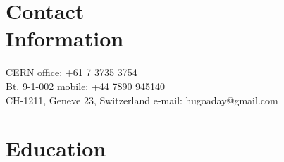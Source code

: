 \documentclass[margin,line]{resume}
\begin{document}
\begin{resume}

    \section{\mysidestyle Contact\\Information}

    CERN                            \hfill office: +61 7 3735 3754          \vspace{0mm}\\\vspace{0mm}%
    Bt. 9-1-002                          \hfill mobile: +44 7890 945140          \vspace{0mm}\\\vspace{0mm}%
    CH-1211, Geneve 23, Switzerland      \hfill e-mail: hugoaday@gmail.com  \vspace{0mm}\\\vspace{-4.5mm}%





    \section{\mysidestyle Education}


\end{resume}
\end{document}
